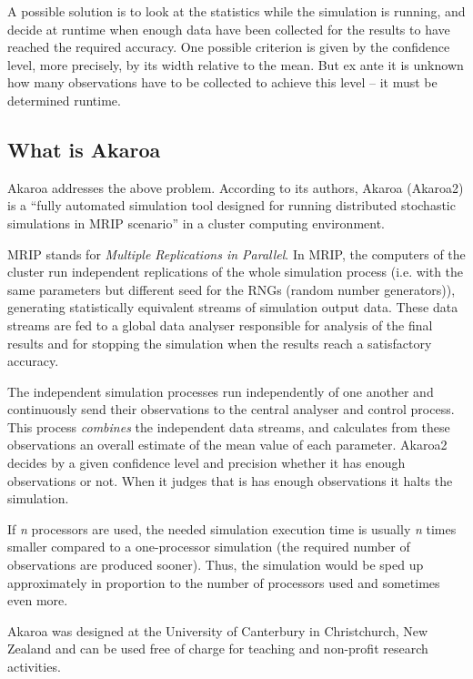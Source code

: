 A possible solution is to look at the statistics while the simulation
is running, and decide at runtime when enough data have been
collected for the results to have reached the required accuracy.
One possible criterion is given by the confidence level,
more precisely, by its width relative to the mean.
But ex ante it is unknown how many observations have to be collected
to achieve this level -- it must be determined runtime.


\subsection{What is Akaroa}

Akaroa \cite{Akaroa99} addresses the above problem.
According to its authors, Akaroa (Akaroa2) is a ``fully automated
simulation tool designed for running distributed stochastic simulations
in MRIP scenario'' in a cluster computing environment.

MRIP stands for \textit{Multiple Replications in Parallel}.
In MRIP, the computers of the cluster run independent replications
of the whole simulation process (i.e. with the same parameters but
different seed for the RNGs (random number generators)),
generating statistically equivalent streams of simulation output data.
These data streams are fed to a global data analyser responsible for
analysis of the final results and for stopping the simulation
when the results reach a satisfactory accuracy.

The independent simulation processes run independently of one another
and continuously send their observations to the central analyser
and control process. This process \textit{combines} the independent data streams,
and calculates from these observations an overall estimate of the mean value
of each parameter.
Akaroa2 decides by a given confidence level and precision
whether it has enough observations or not. When it judges that is
has enough observations it halts the simulation.

If \textit{n} processors are used, the needed simulation execution time
is usually \textit{n} times smaller compared to a one-processor
simulation (the required number of observations are produced sooner).
Thus, the simulation would be sped up approximately in proportion
to the number of processors used and sometimes even more.

Akaroa was designed at the University of Canterbury in Christchurch, New Zealand
and can be used free of charge for teaching and non-profit research activities.


